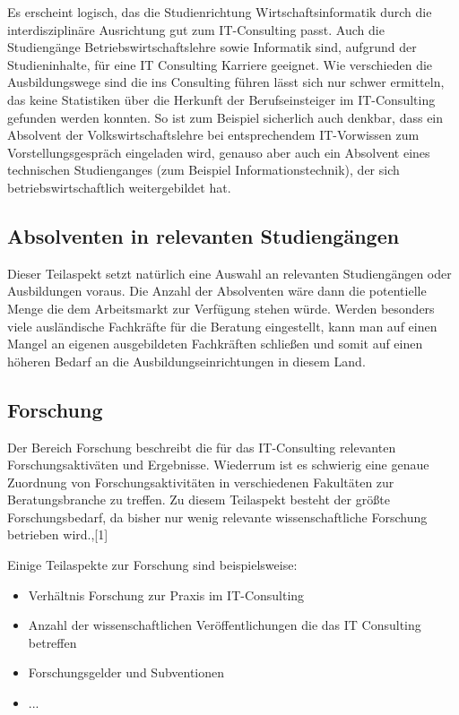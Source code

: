 Es erscheint logisch, das die Studienrichtung Wirtschaftsinformatik durch die interdisziplinäre Ausrichtung gut zum IT-Consulting passt. Auch die Studiengänge Betriebswirtschaftslehre sowie Informatik sind, aufgrund der Studieninhalte, für eine IT Consulting Karriere geeignet. Wie verschieden die Ausbildungswege sind die ins Consulting führen lässt sich nur schwer ermitteln, das keine Statistiken über die Herkunft der Berufseinsteiger im IT-Consulting gefunden werden konnten.
So ist zum Beispiel sicherlich auch denkbar, dass ein Absolvent der Volkswirtschaftslehre bei entsprechendem IT-Vorwissen zum Vorstellungsgespräch eingeladen wird, genauso aber auch ein Absolvent eines technischen Studienganges (zum Beispiel Informationstechnik), der sich betriebswirtschaftlich weitergebildet hat.

\subsection*{Absolventen in relevanten Studiengängen}
Dieser Teilaspekt setzt natürlich eine Auswahl an relevanten Studiengängen oder Ausbildungen voraus. Die Anzahl der Absolventen wäre dann die potentielle Menge die dem Arbeitsmarkt zur Verfügung stehen würde. Werden besonders viele ausländische Fachkräfte für die Beratung eingestellt, kann man auf einen Mangel an eigenen ausgebildeten Fachkräften schließen und somit auf einen höheren Bedarf an die Ausbildungseinrichtungen in diesem Land.

\subsection*{Forschung}
Der Bereich Forschung beschreibt die für das IT-Consulting relevanten Forschungsaktiväten und Ergebnisse. Wiederrum ist es schwierig eine genaue Zuordnung von Forschungsaktivitäten in verschiedenen Fakultäten zur Beratungsbranche zu treffen. Zu diesem Teilaspekt besteht der größte Forschungsbedarf, da bisher nur wenig relevante wissenschaftliche Forschung betrieben wird.\cite[10]{nissen2007consulting},\cite{IDSScheer}[1]

Einige Teilaspekte zur Forschung sind beispielsweise:
\begin{itemize}
\item Verhältnis Forschung zur Praxis im IT-Consulting
\item Anzahl der wissenschaftlichen Veröffentlichungen die das IT Consulting betreffen
\item Forschungsgelder und Subventionen
\item ...
\end{itemize}


